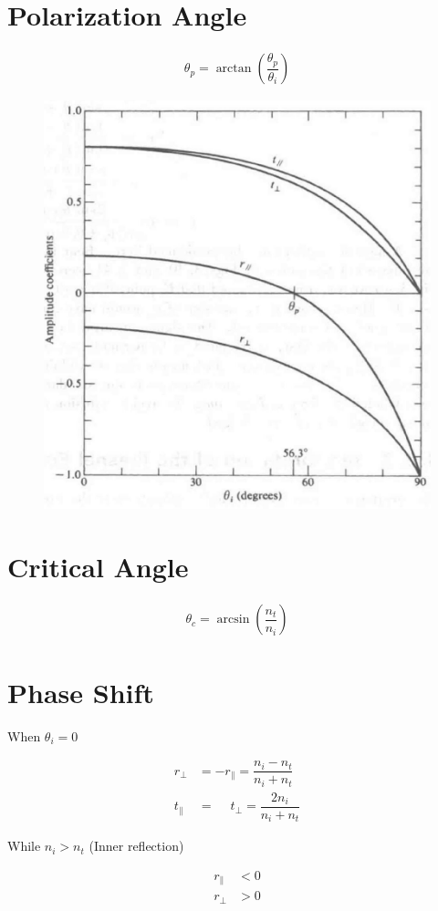 \section{Polarization Angle}

\begin{equation*}
  \begin{aligned}
    \theta_p = \arctan \left( \dfrac{\theta_p}{\theta_i}  \right)
  \end{aligned}
\end{equation*}

\begin{figure}[H]
  \centering
  \includegraphics[width=0.3\linewidth]{figures/Polarization-angle}
\end{figure}

\section{Critical Angle}

\begin{equation*}
  \begin{aligned}
    \theta_c = \arcsin \left( \dfrac{n_t}{n_i}  \right)
  \end{aligned}
\end{equation*}

\section{Phase Shift}

When $\theta_i = 0$

\begin{equation*}
  \begin{aligned}
    r_{\perp} &= - r_{\parallel} = \dfrac{n_i - n_t}{n_i + n_t} \\
    t_{\parallel} &= \phantom{+} t_{\perp} = \dfrac{2 n_i}{n_i + n_t} 
  \end{aligned}
\end{equation*}

While $n_i > n_t$ (Inner reflection)

\begin{equation*}
  \begin{aligned}
    r_{\parallel} &< 0 \\
    r_{\perp} &> 0
  \end{aligned}
\end{equation*}

